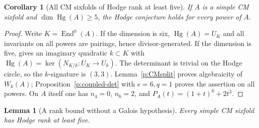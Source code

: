\documentclass[10pt,reqno]{article}
\theoremstyle{emphasizedplain}
\newtheorem{lemma}[theorem]{Lemma}
\newtheorem{corollary}[theorem]{Corollary}
\theoremstyle{emphasizeddefinition}
\theoremstyle{emphasizeddefinition}
\DeclareMathOperator{\End}{End}
\DeclareMathOperator{\Hg}{Hg}
\begin{document}
\begin{corollary}[All CM sixfolds of Hodge rank at least five]
\label{p:CMrankfive}
If $A$ is a simple CM sixfold and $\dim\Hg(A)\ge5$, the Hodge
conjecture holds for every power of $A$.
\end{corollary}
\begin{proof}
Write $K=\End^0(A)$. If the dimension is six, $\Hg(A)=U_K$ and all
invariants on all powers are pairings, hence divisor-generated.
If the dimension is five, \cite[Lemma (3.7)]{MZ} gives an imaginary
quadratic $k\subset K$ with
$\Hg(A)=\ker(N_{K/k}:U_K\to U_k)$.
The determinant is trivial on the Hodge circle, so the $k$-signature
is $(3,3)$. Lemma~\ref{p:CMsplit} proves algebraicity of $W_k(A)$;
Proposition~\ref{p:coupled-det} with $e=6,q=1$ proves the assertion on all
powers. On $A$ itself one has $n_4=0$, $n_6=2$, and
$P_A(t)=(1+t)^6+2t^3$.
\end{proof}
\begin{lemma}[A rank bound without a Galois hypothesis]\label{p:CMsixrank}
Every simple CM sixfold has Hodge rank at least five.
\end{lemma}
\end{document}
